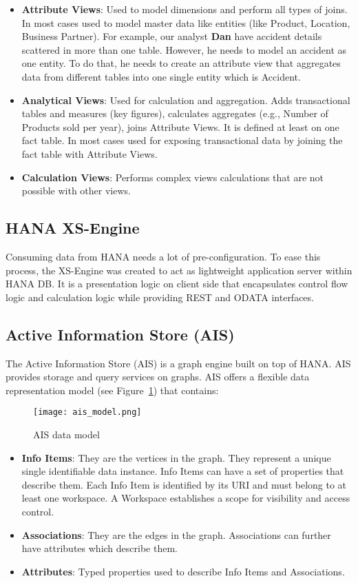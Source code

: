 \begin{itemize}
	\item \textbf{Attribute Views}: Used to model dimensions and perform all types of joins. In most cases used to model master data like entities (like Product, Location, Business Partner). For example, our analyst \textbf{Dan} have accident details scattered in more than one table. However, he needs to model an accident as one entity. To do that, he needs to create an attribute view that aggregates data from different tables into one single entity which is Accident.
	\item \textbf{Analytical Views}: Used for calculation and aggregation. Adds transactional tables and measures (key figures), calculates aggregates (e.g., Number of Products sold per year), joins Attribute Views. It is defined at least on one fact table. In most cases used for exposing transactional data by joining the fact table with Attribute Views.
	\item \textbf{Calculation Views}: Performs complex views calculations that are not possible with other views.
\end{itemize}

\subsection{HANA XS-Engine}

Consuming data from HANA needs a lot of pre-configuration. To ease this process, the XS-Engine was created to act as lightweight application server within HANA DB. It is a presentation logic on client side that encapsulates control flow logic and calculation logic while providing REST and ODATA interfaces.

\subsection{Active Information Store (AIS)} \label{ais}

The Active Information Store (AIS) is a graph engine built on top of HANA. AIS provides storage and query services on graphs. AIS offers a flexible data representation model (see Figure~\ref{fig:ais}) that contains:

\begin{figure}[htbp]
\centering
	\texttt{[image: ais\_model.png]}
	\caption{AIS data model}
	\label{fig:ais}
\end{figure}

\begin{itemize}
	\item \textbf{Info Items}: They are the vertices in the graph. They represent a unique single identifiable data instance. Info Items can have a set of properties that describe them. Each Info Item is identified by its URI and must belong to at least one workspace. A Workspace establishes a scope for visibility and access control.
	\item \textbf{Associations}: They are the edges in the graph. Associations can further have attributes which describe them.
	\item \textbf{Attributes}: Typed properties used to describe Info Items and Associations.
\end{itemize}

